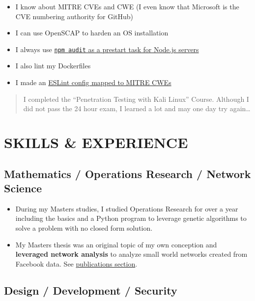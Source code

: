 \documentclass[10pt]{article}
\def\tightlist{}
\begin{document}
\begin{itemize}
\tightlist
\item
  I know about MITRE CVEs and CWE (I even know that Microsoft is the CVE
  numbering authority for GitHub)
\item
  I can use OpenSCAP to harden an OS installation
\item
  I always use
  \href{https://github.com/jhwohlgemuth/tomo-cli/blob/master/src/commands/create-server/index.js\#L82}{\texttt{npm\ audit}
  as a prestart task for Node.js servers}
\item
  I also lint my Dockerfiles
\item
  I made an
  \href{https://github.com/omahajs/eslint-config-omaha-prime-grade/blob/master/RULES_FOR_SECURITY.md}{ESLint
  config mapped to MITRE CWEs}
\end{itemize}

\begin{quote}
I completed the ``Penetration Testing with Kali Linux'' Course. Although
I did not pass the 24 hour exam, I learned a lot and may one day try
again\ldots{}
\end{quote}

\hypertarget{skills-experience}{%
\section{SKILLS \& EXPERIENCE}\label{skills-experience}}

\hypertarget{mathematics-operations-research-network-science}{%
\subsection{Mathematics / Operations Research / Network
Science}\label{mathematics-operations-research-network-science}}

\begin{itemize}
\tightlist
\item
  During my Masters studies, I studied Operations Research for over a
  year including the basics and a Python program to leverage genetic
  algorithms to solve a problem with no closed form solution.
\item
  My Masters thesis was an original topic of my own conception and
  \textbf{leveraged network analysis} to analyze small world networks
  created from Facebook data. See
  \protect\hyperlink{publications-citations}{publications section}.
\end{itemize}

\hypertarget{design-development-security}{%
\subsection{Design / Development /
Security}\label{design-development-security}}
\end{document}
